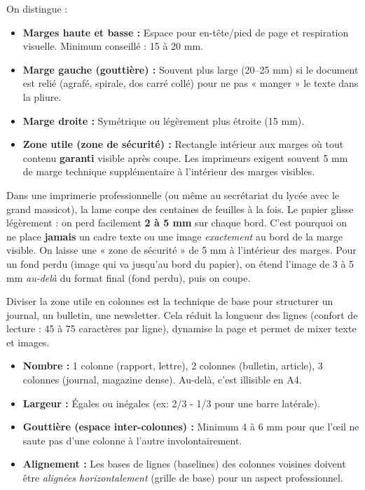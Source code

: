 \documentclass[11pt]{article}
\newcommand{\cle}[1]{{\popxbold\color{popdark}#1}}
\newcounter{popsec}
\newcounter{popsub}
\newcommand{\courssub}[1]{%
  \stepcounter{popsub}%
  \par\vspace{9pt}\noindent{\popxbold\fontsize{11.5}{13}\selectfont\color{popink}{\color{poporange}\thepopsec.\thepopsub}\hspace{6pt}#1}\par\nopagebreak\vspace{4pt}
}
\begin{document}
\begin{definition}
On distingue :
\begin{itemize}
    \item \textbf{Marges haute et basse :} Espace pour en-tête/pied de page et respiration visuelle. Minimum conseillé : 15 à 20 mm.
    \item \textbf{Marge gauche (gouttière) :} Souvent plus large (20–25 mm) si le document est relié (agrafé, spirale, dos carré collé) pour ne pas « manger » le texte dans la pliure.
    \item \textbf{Marge droite :} Symétrique ou légèrement plus étroite (15 mm).
    \item \textbf{Zone utile (zone de sécurité) :} Rectangle intérieur aux marges où tout contenu \textbf{garanti} visible après coupe. Les imprimeurs exigent souvent 5 mm de marge technique supplémentaire à l'intérieur des marges visibles.
\end{itemize}
\end{definition}

\begin{savaistu}
Dans une imprimerie professionnelle (ou même au secrétariat du lycée avec le grand massicot), la lame coupe des centaines de feuilles à la fois. Le papier glisse légèrement : on perd facilement \textbf{2 à 5 mm} sur chaque bord. C'est pourquoi on ne place \textbf{jamais} un cadre texte ou une image \emph{exactement} au bord de la marge visible. On laisse une « zone de sécurité » de 5 mm à l'intérieur des marges. Pour un fond perdu (image qui va jusqu'au bord du papier), on étend l'image de 3 à 5 mm \emph{au-delà} du format final (fond perdu), puis on coupe.
\end{savaistu}

\courssub{Structure en colonnes}

Diviser la zone utile en \cle{colonnes} est la technique de base pour structurer un journal, un bulletin, une newsletter. Cela réduit la longueur des lignes (confort de lecture : 45 à 75 caractères par ligne), dynamise la page et permet de mixer texte et images.

\begin{propriete}
\begin{itemize}
    \item \textbf{Nombre :} 1 colonne (rapport, lettre), 2 colonnes (bulletin, article), 3 colonnes (journal, magazine dense). Au-delà, c'est illisible en A4.
    \item \textbf{Largeur :} Égales ou inégales (ex: 2/3 - 1/3 pour une barre latérale).
    \item \textbf{Gouttière (espace inter-colonnes) :} Minimum 4 à 6 mm pour que l'œil ne saute pas d'une colonne à l'autre involontairement.
    \item \textbf{Alignement :} Les bases de lignes (baselines) des colonnes voisines doivent être \emph{alignées horizontalement} (grille de base) pour un aspect professionnel.
\end{itemize}
\end{propriete}
\end{document}
